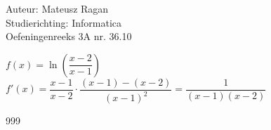\documentclass[a4paper]{article}
\begin{document}
\noindent \large Auteur: Mateusz Ragan \\
\noindent \large Studierichting: Informatica\\
\noindent \large Oefeningenreeks 3A nr. 36.10 \\

\medskip

\normalsize

$f(x) = \ln \left(\dfrac{x-2}{x-1}\right)$\\

$f'(x) = \dfrac{x-1}{x-2} \cdot \dfrac{(x-1) - (x-2)}{(x-1)^2} = \dfrac{1}{(x-1)(x-2)}$

\begin{thebibliography}{999}
\end{thebibliography}
\end{document}
